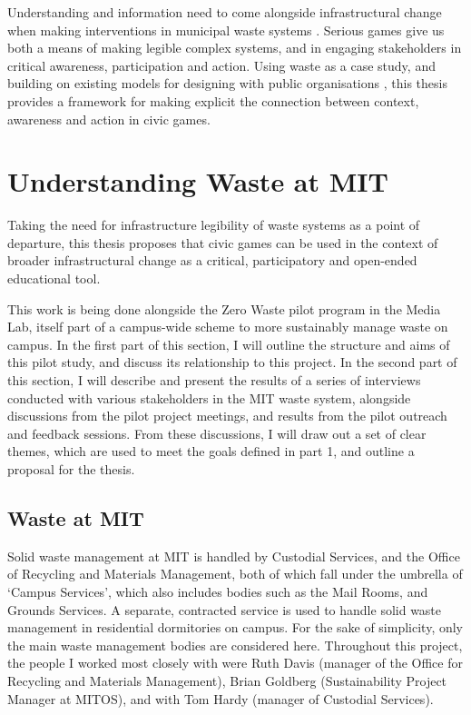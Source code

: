 \documentclass[nofonts,nols,justified,nobib]{tufte-book}
\begin{document}
Understanding and information need to come alongside infrastructural change when making interventions in municipal waste systems \cite{kline_rationalizing_1988}. Serious games give us both a means of making legible complex systems, and in engaging stakeholders in critical awareness, participation and action. Using waste as a case study, and building on existing models for designing with public organisations \cite{schaminee_designing_2018}, this thesis provides a framework for making explicit the connection between context, awareness and action in civic games.




\chapter{Understanding Waste at MIT}

Taking the need for infrastructure legibility of waste systems as a point of departure, this thesis proposes that civic games can be used in the context of broader infrastructural change as a critical, participatory and open-ended educational tool.

This work is being done alongside the Zero Waste pilot program in the Media Lab, itself part of a campus-wide scheme to more sustainably manage waste on campus. In the first part of this section, I will outline the structure and aims of this pilot study, and discuss its relationship to this project. In the second part of this section, I will describe and present the results of a series of interviews conducted with various stakeholders in the MIT waste system, alongside discussions from the pilot project meetings, and results from the pilot outreach and feedback sessions. From these discussions, I will draw out a set of clear themes, which are used to meet the goals defined in part 1, and outline a proposal for the thesis.

\section*{Waste at MIT}

Solid waste management at MIT is handled by Custodial Services, and the Office of Recycling and Materials Management, both of which fall under the umbrella of `Campus Services', which also includes bodies such as the Mail Rooms, and Grounds Services. A separate, contracted service is used to handle solid waste management in residential dormitories on campus. For the sake of simplicity, only the main waste management bodies are considered here. Throughout this project, the people I worked most closely with were Ruth Davis (manager of the Office for Recycling and Materials Management), Brian Goldberg (Sustainability Project Manager at MITOS), and with Tom Hardy (manager of Custodial Services).
\end{document}
